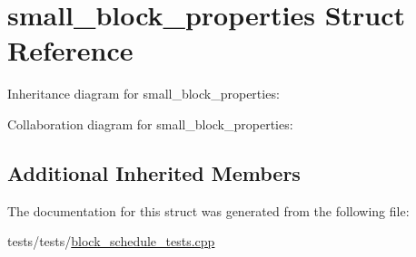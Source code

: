 \hypertarget{structsmall__block__properties}{}\section{small\+\_\+block\+\_\+properties Struct Reference}
\label{structsmall__block__properties}


Inheritance diagram for small\+\_\+block\+\_\+properties\+:


Collaboration diagram for small\+\_\+block\+\_\+properties\+:
\subsection*{Additional Inherited Members}


The documentation for this struct was generated from the following file\+:\begin{DoxyCompactItemize}
\item 
tests/tests/\mbox{\hyperlink{block__schedule__tests_8cpp}{block\+\_\+schedule\+\_\+tests.\+cpp}}\end{DoxyCompactItemize}
